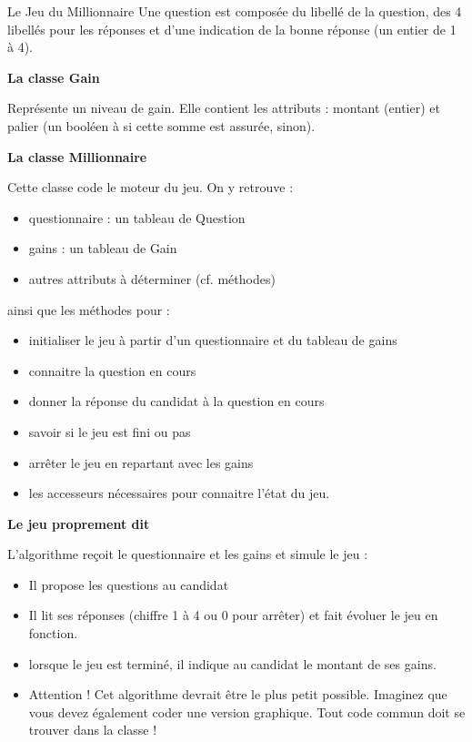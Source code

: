 \begin{Exercice}{Le Jeu du Millionnaire}
	Une question est composée du libellé de la question, des 4 libellés pour
	les réponses et d’une indication de la bonne réponse 
	(un entier de 1 à 4).

	{\bfseries La classe Gain}

	Représente un niveau de gain. Elle contient les attributs :
	montant (entier) et palier 
	(un booléen à  si cette somme est assurée,  sinon).

	{\bfseries La classe Millionnaire}

	Cette classe code le moteur du jeu. On y retrouve :
	\begin{itemize}
		\item 
			questionnaire : un tableau de Question
		\item 
			gains : un tableau de Gain
		\item 
			autres attributs à déterminer (cf. méthodes)
	\end{itemize}
	
	ainsi que les méthodes pour :
	\begin{itemize}
		\item 
			initialiser le jeu à partir d’un questionnaire
			et du tableau de gains
		\item 
			connaitre la question en cours
		\item 
			donner la réponse du candidat à la question en
			cours
		\item 
			savoir si le jeu est fini ou pas
		\item 
			arrêter le jeu en repartant avec les gains
		\item 
			les accesseurs nécessaires pour connaitre
			l’état du jeu.
	\end{itemize}
	
	{\bfseries
	Le jeu proprement dit}

	L'algorithme  reçoit le
	questionnaire et les gains et simule le jeu :
	\begin{itemize}
	\item 
		Il propose les questions au candidat
	\item 
		Il lit ses réponses (chiffre 1 à 4 ou 0 pour
		arrêter) et fait évoluer le jeu en fonction.
	\item 
		lorsque le jeu est terminé, il indique au
		candidat le montant de ses gains.
	\item 
		Attention ! Cet algorithme devrait être le plus
		petit possible. Imaginez que vous devez également coder une version
		graphique. Tout code commun doit se trouver dans la classe
	!
	\end{itemize}
\end{Exercice}

